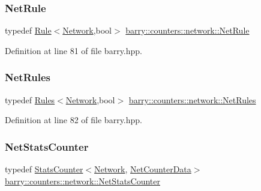 \subsubsection{\texorpdfstring{Net\+Rule}{NetRule}}
{\footnotesize\ttfamily typedef \hyperlink{classbarry_1_1_rule}{Rule}$<$\hyperlink{namespacebarry_1_1counters_1_1network_a440182967e1ba465e90a4b1d07e3a366}{Network},bool$>$ \hyperlink{namespacebarry_1_1counters_1_1network_afbd2c2a61931e69dd5f668c421e87a6f}{barry\+::counters\+::network\+::\+Net\+Rule}}



Definition at line 81 of file barry.\+hpp.

\mbox{\label{namespacebarry_1_1counters_1_1network_adbdb20b3ce883777da2364984ea10c56}} 
\subsubsection{\texorpdfstring{Net\+Rules}{NetRules}}
{\footnotesize\ttfamily typedef \hyperlink{classbarry_1_1_rules}{Rules}$<$\hyperlink{namespacebarry_1_1counters_1_1network_a440182967e1ba465e90a4b1d07e3a366}{Network},bool$>$ \hyperlink{namespacebarry_1_1counters_1_1network_adbdb20b3ce883777da2364984ea10c56}{barry\+::counters\+::network\+::\+Net\+Rules}}



Definition at line 82 of file barry.\+hpp.

\mbox{\label{namespacebarry_1_1counters_1_1network_ae26c399917113fe280b3f2859376b8b9}} 
\subsubsection{\texorpdfstring{Net\+Stats\+Counter}{NetStatsCounter}}
{\footnotesize\ttfamily typedef \hyperlink{classbarry_1_1_stats_counter}{Stats\+Counter}$<$\hyperlink{namespacebarry_1_1counters_1_1network_a440182967e1ba465e90a4b1d07e3a366}{Network}, \hyperlink{classbarry_1_1counters_1_1network_1_1_net_counter_data}{Net\+Counter\+Data}$>$ \hyperlink{namespacebarry_1_1counters_1_1network_ae26c399917113fe280b3f2859376b8b9}{barry\+::counters\+::network\+::\+Net\+Stats\+Counter}}



